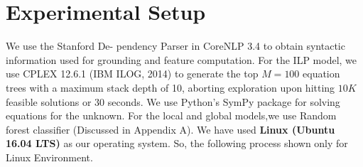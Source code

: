 \documentclass[document.tex]{subfiles}
\begin{document}
\section{Experimental Setup}
We use the Stanford De-
pendency Parser in CoreNLP 3.4\cite{32} to obtain syntactic information used for
grounding and feature computation. For the ILP
model, we use CPLEX 12.6.1 (IBM ILOG, 2014)\cite{33}
to generate the top $M = 100$ equation trees with
a maximum stack depth of 10, aborting exploration
upon hitting $10K$ feasible solutions or $30$ seconds.
We use Python’s SymPy package for solving equations for the unknown. For the local and global models,we use Random forest classifier \cite{34,35}(Discussed in Appendix A).
We have used \textbf{Linux (Ubuntu 16.04 LTS)} as our operating system. So, the following process shown only for Linux Environment.
%
%
%
\end{document}
